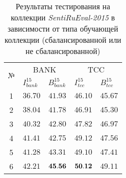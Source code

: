 \begin{table}[ht!]
\centering
\caption{Результаты тестирования на коллекции {\it SentiRuEval-2015}
в зависимости от типа обучающей коллекции (сбалансированной или не сбалансированной)}
\label{table:results2015}
\begin{tabular}{ccccc}
\hline
\multicolumn{1}{c|}{\multirow{2}{*}{№}} & \multicolumn{2}{c|}{BANK}                                                   & \multicolumn{2}{c}{TCC}                                                  \\ \cline{2-5}
\multicolumn{1}{c|}{}                   & \multicolumn{1}{l|}{$I_{bank}^{15}$} & \multicolumn{1}{l|}{$B_{bank}^{15}$} & \multicolumn{1}{l|}{$I_{tcc}^{15}$} & \multicolumn{1}{l}{$B_{tcc}^{15}$} \\ \hline
1                                       & $36.70$                              & $41.93$                              & $46.10$                             & $45.67$                            \\
2                                       & $38.04$                              & $41.78$                              & $46.91$                             & $45.30$                            \\
3                                       & $40.32$                              & $42.80$                              & $47.82$                             & $46.97$                            \\
4                                       & $41.41$                              & $42.75$                              & $49.12$                             & $47.56$                            \\
5                                       & $41.28$                              & $43.31$                              & $49.10$                             & $47.41$                            \\
6                                       & $42.21$                              & ${\bf 45.56}$                        & ${\bf50.12}$                       & $49.11$                            \\ \hline
\end{tabular}
\end{table}
